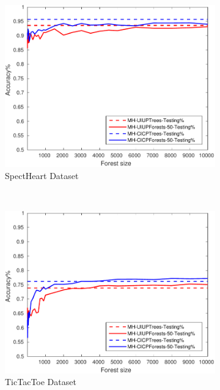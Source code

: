\begin{figure}[ht]
\begin{subfigure}[b]{0.3\textwidth}
  	\includegraphics[width=\textwidth]{figs/PLPTF/Forests/SpectHeartDownsampledFurther_Forests_MH.pdf}
  	\caption{SpectHeart Dataset}
		\label{fig:S4}
	\end{subfigure}
  \\
  \begin{subfigure}[b]{0.3\textwidth}
		\centering
  	\includegraphics[width=\textwidth]{figs/PLPTF/Forests/TicTacToe_Forests_MH.pdf}
  	\caption{TicTacToe Dataset}
		\label{fig:T4}
	\end{subfigure}
  \begin{subfigure}[b]{0.3\textwidth}
		\centering

\end{subfigure}
\end{figure}
